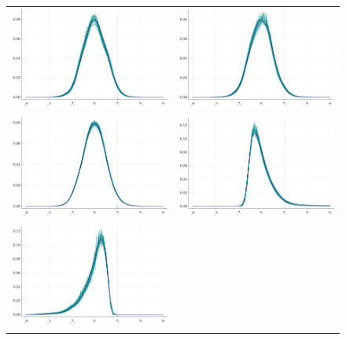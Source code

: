 \begin{figure}[h]
	\centering
	\begin{tabular}[b]{c c }
				\includegraphics[width=.50\textwidth]{Figures/1a/W.pdf} & \includegraphics[width=.50\textwidth]{Figures/1b/W.pdf} \\ \includegraphics[width=.50\textwidth]{Figures/1c/W.pdf} &		\includegraphics[width=.50\textwidth]{Figures/2a/W.pdf} \\
		 \includegraphics[width=.50\textwidth]{Figures/2b/W.pdf} & 

\end{tabular}
\end{figure}
